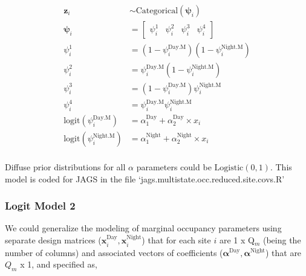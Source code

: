 \documentclass[12pt]{article}
\begin{document}
\begin{center}
\begin{align*}
\textbf{z}_{i} &\sim \text{Categorical}(\boldsymbol{\psi}_{i})\\
\boldsymbol{\psi}_{i} &= \begin{bmatrix} \psi^1_{i} & \psi^2_{i} & \psi^3_{i} & \psi^4_{i} \end{bmatrix}\\
\psi^1_{i} &=(1-\psi^{\text{Day.M}}_{i})(1-\psi^{\text{Night.M}}_{i})\\%
\psi^2_{i} &=\psi^{\text{Day.M}}_{i}(1-\psi^{\text{Night.M}}_{i})\\
\psi^3_{i} &=(1-\psi^{\text{Day.M}}_{i})\psi^{\text{Night.M}}_{i}\\
\psi^4_{i} &=\psi^{\text{Day.M}}_{i}\psi^{\text{Night.M}}_{i}\\
\text{logit}(\psi^{\text{Day.M}}_{i}) &= \alpha_{1}^{\text{Day}}+\alpha_{2}^{\text{Day}}\times x_{i}\\
\text{logit}(\psi^{\text{Night.M}}_{i}) &= \alpha_{1}^{\text{Night}}+\alpha_{2}^{\text{Night}}\times x_{i}\\
\end{align*}
\end{center}

Diffuse prior distributions for all $\alpha$ parameters could be $\text{Logistic}(0,1)$. This model is coded for JAGS in the file `jags.multistate.occ.reduced.site.covs.R'

\subsubsection{Logit Model 2}
We could generalize the modeling of marginal occupancy parameters using separate design matrices ($\textbf{x}_{i}^{\text{Day}}, \textbf{x}_{i}^{\text{Night}}$) that for each site $i$ are  1 x Q$_{m}$ (being the number of columns) and associated vectors of coefficients ($\boldsymbol{\alpha}^{\text{Day}}, \boldsymbol{\alpha}^{\text{Night}}$) that are $Q_{m}$ x 1, and specified as,
\end{document}
